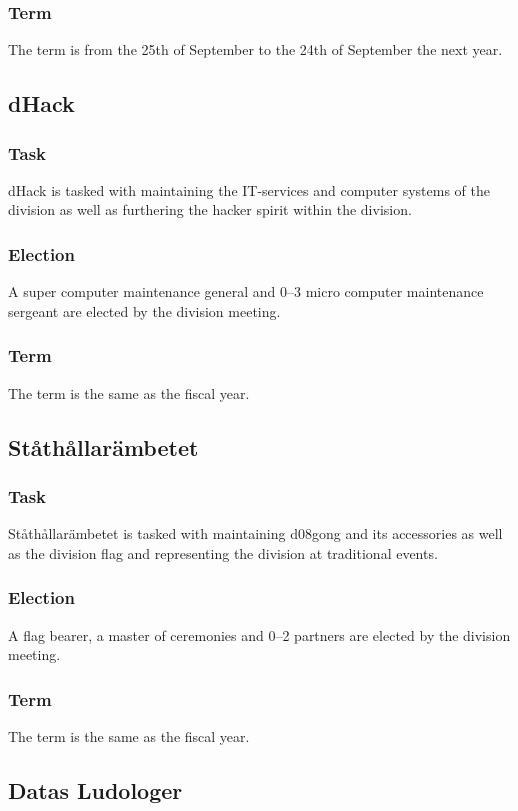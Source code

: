\subsubsection{Term}
The term is from the 25th of September to the 24th of September the next year. 

\subsection{dHack}
\subsubsection{Task}
dHack is tasked with maintaining the IT-services and computer systems of the division as well as furthering the hacker spirit within the division. 
\subsubsection{Election}
A super computer maintenance general and 0--3 micro computer maintenance sergeant are elected by the division meeting.
\subsubsection{Term}
The term is the same as the fiscal year. 

\subsection{Ståthållarämbetet}
\subsubsection{Task}
Ståthållarämbetet is tasked with maintaining d08gong and its accessories as well as the division flag and representing the division at traditional events. 
\subsubsection{Election}
A flag bearer, a master of ceremonies and 0--2 partners are elected by the division meeting. 
\subsubsection{Term}
The term is the same as the fiscal year. 

\subsection{Datas Ludologer}
